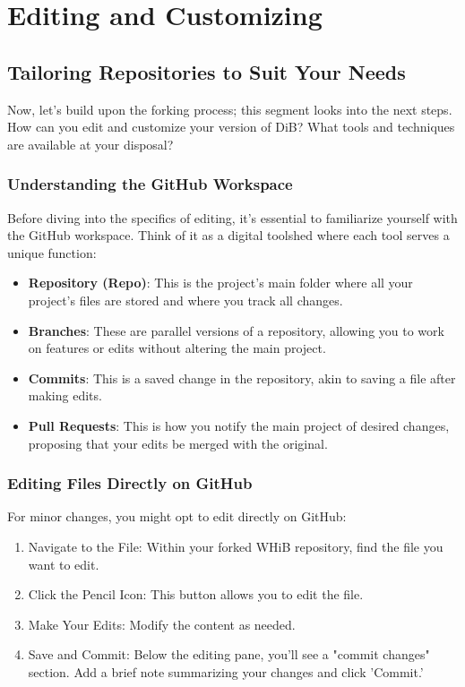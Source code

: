 \documentclass{book}
\begin{document}
\chapter{Editing and Customizing}
\section*{Tailoring Repositories to Suit Your Needs}
Now, let's build upon the forking process; this segment looks into the next steps. How can you edit and customize your version of DiB? What tools and techniques are available at your disposal? 

\subsection*{Understanding the GitHub Workspace}
Before diving into the specifics of editing, it's essential to familiarize yourself with the GitHub workspace. Think of it as a digital toolshed where each tool serves a unique function:

\begin{itemize}
    \item \textbf{Repository (Repo)}: This is the project's main folder where all your project's files are stored and where you track all changes.
    \item \textbf{Branches}: These are parallel versions of a repository, allowing you to work on features or edits without altering the main project.
    \item \textbf{Commits}: This is a saved change in the repository, akin to saving a file after making edits.
    \item \textbf{Pull Requests}: This is how you notify the main project of desired changes, proposing that your edits be merged with the original.
\end{itemize}

\subsection*{Editing Files Directly on GitHub}
For minor changes, you might opt to edit directly on GitHub:

\begin{enumerate}
    \item Navigate to the File: Within your forked WHiB repository, find the file you want to edit.
    \item Click the Pencil Icon: This button allows you to edit the file.
    \item Make Your Edits: Modify the content as needed.
    \item Save and Commit: Below the editing pane, you'll see a "commit changes" section. Add a brief note summarizing your changes and click 'Commit.'
\end{enumerate}
\end{document}
